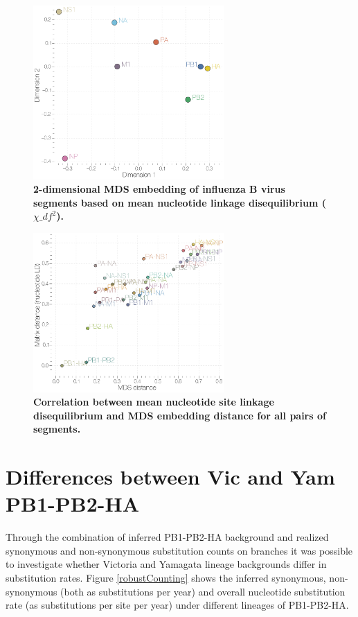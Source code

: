 \documentclass[11pt,oneside,letterpaper]{article}
\begin{document}
\begin{figure}
\centering  
\includegraphics[width=0.65\textwidth]  {supp_figures/InfB_8x8_ntLD_MDS.png}
\caption{\textbf{2-dimensional MDS embedding of influenza B virus segments based on mean nucleotide linkage disequilibrium ($\chi\_{df}^{2}$).}}
\label{MDSntLD}
\end{figure}

\begin{figure}
\centering  
\includegraphics[width=0.65\textwidth]  {supp_figures/InfB_ntLD_MatrixMDScorr.png}
\caption{\textbf{Correlation between mean nucleotide site linkage disequilibrium and MDS embedding distance for all pairs of segments.}}
\label{MDSntCorr}
\end{figure}

\section*{Differences between Vic and Yam PB1-PB2-HA}
Through the combination of inferred PB1-PB2-HA background and realized synonymous and non-synonymous substitution counts on branches \cite{obrien2009} it was possible to investigate whether Victoria and Yamagata lineage backgrounds differ in substitution rates.
Figure \ref{robustCounting} shows the inferred synonymous, non-synonymous (both as substitutions per year) and overall nucleotide substitution rate (as substitutions per site per year) under different lineages of PB1-PB2-HA.
\end{document}
